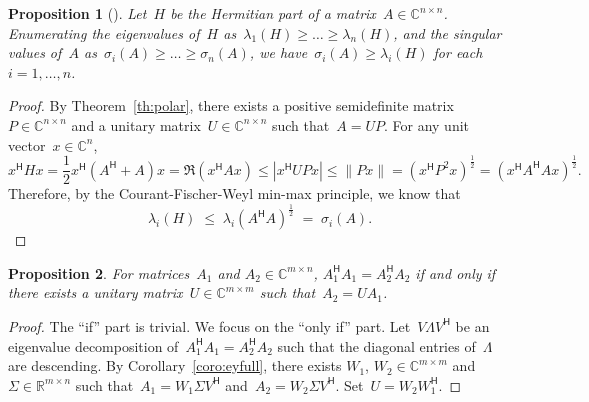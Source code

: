 \documentclass[11pt,a4paper]{article}  %
\newcommand{\bibfile}{ref-svd.bib}  %
\numberwithin{equation}{section}
\newtheorem{proposition}{Proposition}%
\theoremstyle{definition}
\def\RR{\mathbb{R}}
\def\CC{\mathbb{C}}
\newcommand{\hmt}{{\scriptscriptstyle{{\mathsf{H}}}}}
\begin{document}
\begin{proposition}[\cite{Fan_Hoffman_1955}]
  Let~$H$ be the Hermitian part of a matrix~$A \in \CC^{n\times n}$. Enumerating the eigenvalues
  of~$H$ as~$\lambda_1(H) \ge\dots\ge \lambda_n(H)$, and the singular values of~$A$
  as~$\sigma_i(A) \ge\dots\ge \sigma_n(A)$, we have~$\sigma_{i}(A)\ge
  \lambda_i(H)$ for each~$i = 1, \dots, n$.
\end{proposition}

\begin{proof}
  By Theorem~\ref{th:polar}, there exists a positive semidefinite matrix~$P\in \CC^{n\times n}$ and
  a unitary matrix~$U\in \CC^{n\times n}$ such that~$A = UP$. For any unit vector~$x\in \CC^n$,
  \begin{equation*}
    x^\hmt H x = \frac{1}{2}x^\hmt (A^\hmt + A)x = \Re(x^\hmt A x) \le %
    |x^\hmt U P x|\le \|Px\| = (x^\hmt P^2 x)^{\frac{1}{2}} =(x^\hmt A^\hmt A x)^{\frac{1}{2}}.
  \end{equation*}
  Therefore, by the Courant-Fischer-Weyl min-max principle, we know that
  \begin{equation*}
    \lambda_i(H) \;\le\; \lambda_i(A^\hmt A)^{\frac{1}{2}}\;=\; \sigma_i(A).
  \end{equation*}
\end{proof}

\begin{proposition}
  For matrices~$A_1$ and $A_2 \in \CC^{m\times n}$, $A_1^\hmt A_1 = A_2^\hmt A_2$ if and only if there exists a unitary
  matrix~$U \in \CC^{m\times m}$ such that~$A_2 = UA_1$.
\end{proposition}

\begin{proof}
  The ``if'' part is trivial. We focus on the ``only if'' part.
  Let~$V \Lambda V^\hmt$ be an eigenvalue decomposition of~$A_1^\hmt A_1 = A_2^\hmt A_2$ such that
  the diagonal entries of~$\Lambda$ are descending. By
  Corollary~\ref{coro:eyfull}, there exists $W_1$, $W_2\in \CC^{m\times m}$ and~$\Sigma \in \RR^{m\times n}$
  such that~$A_1=W_1 \Sigma V^\hmt$
  and~$A_2 = W_2 \Sigma V^\hmt$. Set~$U = W_2W_1^\hmt$.
\end{proof}

\small


\end{document}
